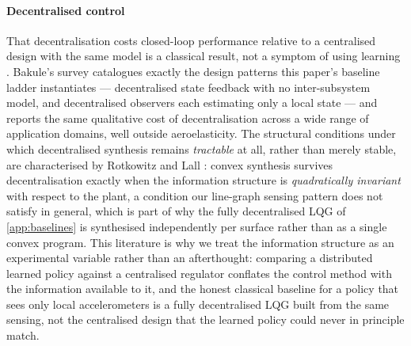 \documentclass[preprint,11pt,authoryear]{elsarticle}
\begin{document}
\paragraph{Decentralised control}
That decentralisation costs closed-loop performance relative to a centralised
design with the same model is a classical result, not a symptom of using
learning \citep{siljak1991decentralized,bakule2008decentralized}. Bakule's
survey \citep{bakule2008decentralized} catalogues exactly the design patterns
this paper's baseline ladder instantiates --- decentralised state feedback with
no inter-subsystem model, and decentralised observers each estimating only a
local state --- and reports the same qualitative cost of decentralisation across
a wide range of application domains, well outside aeroelasticity. The
structural conditions under which decentralised synthesis remains
\emph{tractable} at all, rather than merely stable, are characterised by
Rotkowitz and Lall \citep{rotkowitz2006characterization}: convex synthesis
survives decentralisation exactly when the information structure is
\emph{quadratically invariant} with respect to the plant, a condition our
line-graph sensing pattern does not satisfy in general, which is part of why
the fully decentralised LQG of \ref{app:baselines} is synthesised
independently per surface rather than as a single convex program. This
literature is why we treat the information structure as an experimental
variable rather than an afterthought: comparing a distributed learned policy
against a centralised regulator conflates the control method with the
information available to it, and the honest classical baseline for a policy
that sees only local accelerometers is a fully decentralised LQG built from the
same sensing, not the centralised design that the learned policy could never in
principle match.
\end{document}
